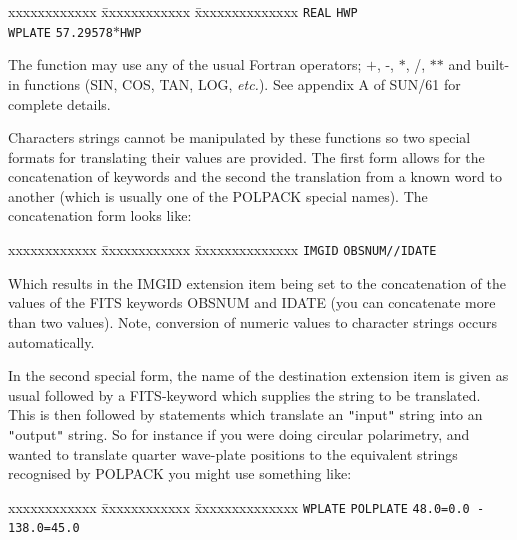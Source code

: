 \documentclass[twoside,11pt]{article}
\newcommand{\xref}[3]{#1}
\renewcommand{\_}{\texttt{\symbol{95}}}
\begin{document}
{{\begin{tabbing}
 xxxxxxxxxxxx \= xxxxxxxxxxxx            \= xxxxxxxxxxxxxx \kill
              \>  \texttt{\_REAL}        \> \texttt{HWP}  \\
              \>  \texttt{WPLATE}        \> \texttt{57.29578$*$HWP}  
\end{tabbing}

      The function may use any of the usual Fortran operators; $+$, -, $*$, /,
      $*$$*$ and built-in functions (SIN, COS, TAN, LOG, \emph{etc.}). See
      \xref{appendix A}{sun61}{appendix_transformation_functions} of 
      \xref{SUN/61}{sun61}{} for complete details.

      Characters strings cannot be manipulated by these functions so two
      special formats for translating their values are provided.
      The first form allows for the concatenation of keywords and
      the second the translation from a known word to another
      (which is usually one of the POLPACK special names). The
      concatenation form looks like:

\begin{tabbing}
 xxxxxxxxxxxx \= xxxxxxxxxxxx            \= xxxxxxxxxxxxxx \kill
              \>  \texttt{IMGID}        \> \texttt{OBSNUM//IDATE}  
\end{tabbing}

      Which results in the IMGID extension item being set to the
      concatenation of the values of the FITS keywords OBSNUM and
      IDATE (you can concatenate more than two values). Note, conversion
      of numeric values to character strings occurs automatically.

      In the second special form, the name of the destination extension item
      is given as usual followed by a FITS-keyword which supplies the string
      to be translated. This is then followed by statements which translate
      an {\tt "}input{\tt "} string into an {\tt "}output{\tt "} string. So for instance if you
      were doing circular polarimetry, and wanted to translate quarter
      wave-plate positions to the equivalent strings recognised by POLPACK
      you might use something like:

\begin{tabbing}
 xxxxxxxxxxxx \= xxxxxxxxxxxx            \= xxxxxxxxxxxxxx \kill
              \>  \texttt{WPLATE}        \> \texttt{POLPLATE} \=  \texttt{48.0=0.0 -} \\
              \>                         \>                   \>  \texttt{138.0=45.0} 
\end{tabbing}

}}
\end{document}
